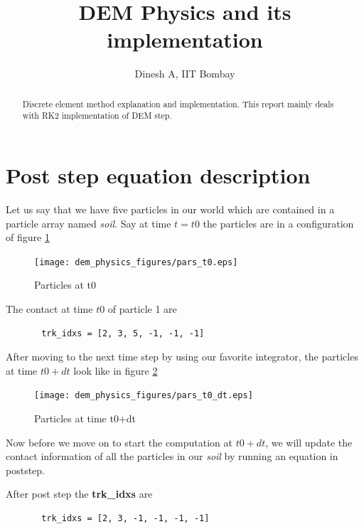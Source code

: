 \documentclass[11pt]{article}
\date{}
\title{}
\begin{document}
\title{\sffamily \textbf{DEM Physics and its implementation}}

\author{Dinesh A, IIT Bombay}

\maketitle


\begin{abstract}
  Discrete element method explanation and implementation. This report mainly
  deals with RK2 implementation of DEM step.
\end{abstract}

\section{Post step equation description}
\label{sec:orge4d9814}
Let us say that we have five particles in our world which are contained in a
particle array named \emph{soil}. Say at time \(t=t0\) the particles are in a configuration of
figure \ref{fig:pars_t0}

\begin{figure}[H]
\centering
\texttt{[image: dem\_physics\_figures/pars\_t0.eps]}
\caption{Particles at t0\label{fig:pars_t0}}
\end{figure}

The contact at time \(t0\) of particle 1 are

\begin{verbatim}
       trk_idxs = [2, 3, 5, -1, -1, -1]
\end{verbatim}

After moving to the next time step by using our favorite integrator, the particles
at time \(t0+dt\) look like in figure \ref{fig:pars_t0_dt}

\begin{figure}[H]
\centering
\texttt{[image: dem\_physics\_figures/pars\_t0\_dt.eps]}
\caption{Particles at time t0+dt\label{fig:pars_t0_dt}}
\end{figure}

Now before we move on to start the computation at \(t0+dt\), we will update the
contact information of all the particles in our \emph{soil} by running an equation
in poststep.

After post step the \textbf{trk\_idxs}  are

\begin{verbatim}
       trk_idxs = [2, 3, -1, -1, -1, -1]
\end{verbatim}
\end{document}
